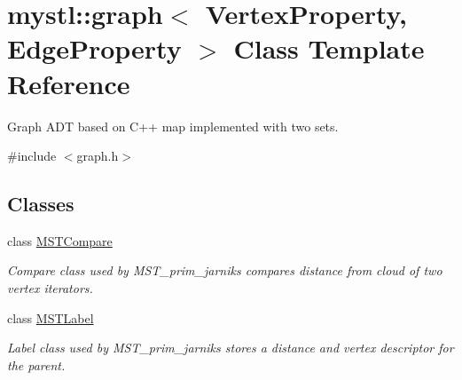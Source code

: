 \hypertarget{classmystl_1_1graph}{\section{mystl\+:\+:graph$<$ Vertex\+Property, Edge\+Property $>$ Class Template Reference}
\label{classmystl_1_1graph}
}


Graph A\+D\+T based on C++ map implemented with two sets.  




{\ttfamily \#include $<$graph.\+h$>$}

\subsection*{Classes}
\begin{DoxyCompactItemize}
\item 
class \hyperlink{classmystl_1_1graph_1_1MSTCompare}{M\+S\+T\+Compare}
\begin{DoxyCompactList}\small\item\em Compare class used by M\+S\+T\+\_\+prim\+\_\+jarniks compares distance from cloud of two vertex iterators. \end{DoxyCompactList}\item 
class \hyperlink{classmystl_1_1graph_1_1MSTLabel}{M\+S\+T\+Label}
\begin{DoxyCompactList}\small\item\em Label class used by M\+S\+T\+\_\+prim\+\_\+jarniks stores a distance and vertex descriptor for the parent. \end{DoxyCompactList}\end{DoxyCompactItemize}
